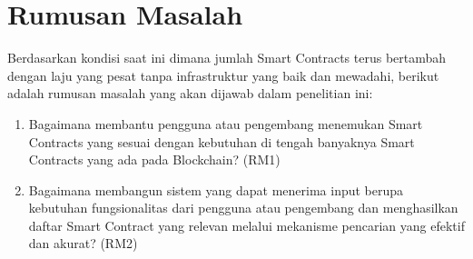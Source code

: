 \section{Rumusan Masalah}
\label{sec:rumusan-masalah}

Berdasarkan kondisi saat ini dimana jumlah Smart Contracts terus bertambah dengan laju yang pesat tanpa infrastruktur yang baik dan mewadahi, berikut adalah rumusan masalah yang akan dijawab dalam penelitian ini:
\begin{enumerate}
  

  \item Bagaimana membantu pengguna atau pengembang menemukan Smart Contracts yang sesuai dengan kebutuhan di tengah banyaknya Smart Contracts yang ada pada Blockchain? (RM1)
  \item Bagaimana membangun sistem yang dapat menerima input berupa kebutuhan fungsionalitas dari pengguna atau pengembang dan menghasilkan daftar Smart Contract yang relevan melalui mekanisme pencarian yang efektif dan akurat? (RM2)


\end{enumerate}
